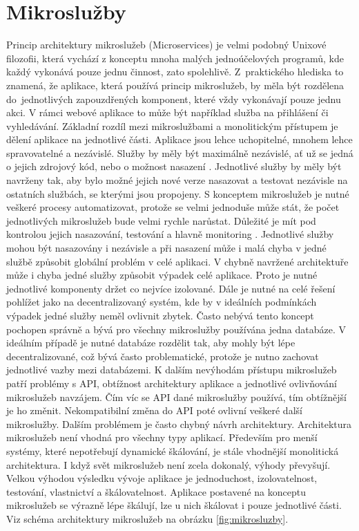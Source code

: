 \section{Mikroslužby}
Princip architektury mikroslužeb (Microservices) je velmi podobný Unixové filozofii, která vychází z konceptu mnoha malých jednoúčelových programů, kde každý vykonává pouze jednu činnost, zato spolehlivě. Z praktického hlediska to znamená, že aplikace, která používá princip mikroslužeb, by měla být rozdělena do jednotlivých zapouzdřených komponent, které vždy vykonávají pouze jednu akci. V rámci webové aplikace to může být například služba na přihlášení či vyhledávání. Základní rozdíl mezi mikroslužbami a monolitickým přístupem je dělení aplikace na jednotlivé části. Aplikace jsou lehce uchopitelné, mnohem lehce spravovatelné a nezávislé. Služby by měly být maximálně nezávislé, ať už se jedná o jejich zdrojový kód, nebo o možnost nasazení \cite{microservices1}. Jednotlivé služby by měly být navrženy tak, aby bylo možné jejich nové verze nasazovat a testovat nezávisle na ostatních službách, se kterými jsou propojeny. S konceptem mikroslužeb je nutné veškeré procesy automatizovat, protože se velmi jednoduše může stát, že počet jednotlivých mikroslužeb bude velmi rychle narůstat. Důležité je mít pod kontrolou jejich nasazování, testování a hlavně monitoring \cite{microservices2}. Jednotlivé služby mohou být nasazovány i nezávisle a při nasazení může i malá chyba v jedné službě způsobit globální problém v celé aplikaci. V chybně navržené architektuře může i chyba jedné služby způsobit výpadek celé aplikace. Proto je nutné jednotlivé komponenty držet co nejvíce izolované. Dále je nutné na celé řešení pohlížet jako na decentralizovaný systém, kde by v ideálních podmínkách výpadek jedné služby neměl ovlivnit zbytek. Často nebývá tento koncept pochopen správně a bývá pro všechny mikroslužby používána jedna databáze. V ideálním případě je nutné databáze rozdělit tak, aby mohly být lépe decentralizované, což bývá často problematické, protože je nutno zachovat jednotlivé vazby mezi databázemi. K dalším nevýhodám přístupu mikroslužeb patří problémy s API, obtížnost architektury aplikace a jednotlivé ovlivňování mikroslužeb navzájem. Čím víc se API dané mikroslužby používá, tím obtížnější je ho změnit. Nekompatibilní změna do API poté ovlivní veškeré další mikroslužby. Dalším problémem je často chybný návrh architektury. Architektura mikroslužeb není vhodná pro všechny typy aplikací. Především pro menší systémy, které nepotřebují dynamické škálování, je stále vhodnější monolitická architektura. I když svět mikroslužeb není zcela dokonalý, výhody převyšují. Velkou výhodou výsledku vývoje aplikace je jednoduchost, izolovatelnost, testování, vlastnictví a škálovatelnost. Aplikace postavené na konceptu mikroslužeb se výrazně lépe škálují, lze u nich škálovat i pouze jednotlivé části. Viz schéma architektury mikroslužeb na obrázku \ref{fig:mikrosluzby}.


